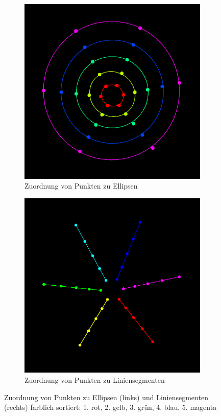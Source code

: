 \begin{figure}[!htb]
	\centering
	\begin{subfigure}{.5\textwidth}
		\centering
		\includegraphics[width=.9\textwidth]{images/ellipseMapping.png}
		\caption{Zuordnung von Punkten zu Ellipsen}
		\label{fig:ellipseMapping}
	\end{subfigure}%
	\begin{subfigure}{.5\textwidth}
		\centering
		\includegraphics[width=.9\textwidth]{images/lineMapping.png}
		\caption{Zuordnung von Punkten zu Liniensegmenten}
		\label{fig:lineMapping}
	\end{subfigure}
	\caption{Zuordnung von Punkten zu Ellipsen (links) und Liniensegmenten (rechts) farblich sortiert: 1. rot, 2. gelb, 3. grün, 4. blau, 5. magenta}
	\label{fig:mapping}
\end{figure}


